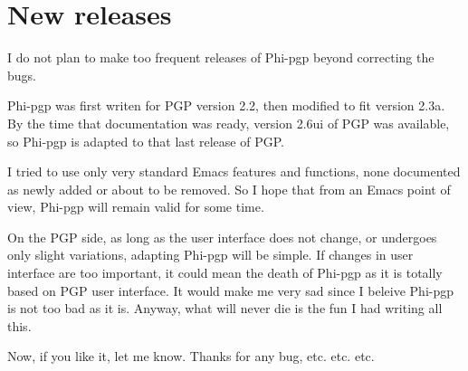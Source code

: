 \section{New releases}

I do not plan  to make too  frequent releases of Phi-pgp beyond
correcting the bugs.

Phi-pgp  was first writen for  PGP version 2.2,   then modified to fit
version 2.3a. By the time that  documentation was ready, version 2.6ui
of PGP was  available, so Phi-pgp is  adapted to that  last release of
PGP.

I tried  to use only very  standard Emacs features and functions, none
documented as newly added or about to be removed. So  I hope that from
an Emacs point of view, Phi-pgp will remain valid for some time.

On the PGP  side, as long  as the user  interface does not change,  or
undergoes only slight variations, adapting Phi-pgp will be simple.  If
changes  in user interface are too  important, it could mean the death
of Phi-pgp as it is totally based on PGP user interface. It would make
me very sad since I beleive Phi-pgp is  not too bad  as it is. Anyway,
what will never die is the fun I had writing all this.

Now, if you like it, let me know.  Thanks for any bug, etc. etc. etc.

